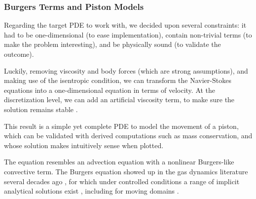 \subsubsection{Burgers Terms and Piston Models}
Regarding the target PDE to work with, we decided upon several constraints:
it had to be one-dimensional (to ease implementation), 
contain non-trivial terms (to make the problem interesting),
and be physically sound (to validate the outcome).


Luckily, removing viscosity and body forces (which are strong assumptions), 
and making use of the isentropic condition,
we can transform the Navier-Stokes equations 
into a one-dimensional equation \cite{1860_Earnshow, nonlinearDiffusiveWaves}
in terms of velocity.
At the discretization level, 
we can add an artificial viscosity term,
to make sure the solution remains stable \cite{2011_artificialViscosityPOD}.

This result is a simple yet complete PDE to model the movement of a piston, 
which can be validated with derived computations such as mass conservation,
and whose solution makes intuitively sense when plotted.

The equation resembles an advection equation with 
a nonlinear Burgers-like convective term.
The Burgers equation showed up in the gas dynamics literature several decades ago
\cite{BURGERS1948171,
moran_shen_1966,
1969nonlinearWavePropagationInARelaxingGas,
1951_quasiLinearParabolicEquationOcuringAerodynamics},
for which under controlled conditions 
a range of implicit analytical solutions exist \cite{1972_TableSolutionsBurgers},
including for moving domains \cite{2000_burgersMovingDomainAnalytical}.

